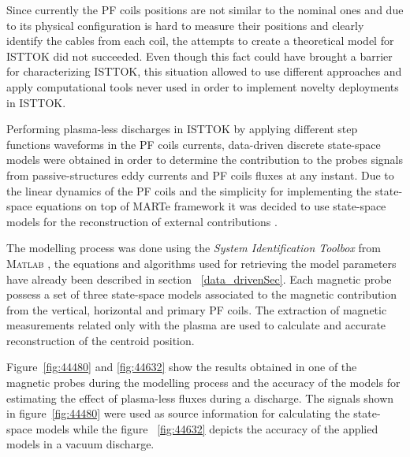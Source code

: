 Since currently the PF coils positions are not similar to the nominal ones and due to its physical configuration is hard to measure their positions and clearly identify the cables from each coil, the attempts to create a theoretical model for ISTTOK did not succeeded. Even though this fact could have brought a barrier for characterizing ISTTOK, this situation allowed to use different approaches and apply computational tools never used  in order to implement novelty deployments in ISTTOK.   \smallskip

Performing plasma-less discharges in ISTTOK by applying different step functions waveforms in the PF coils currents,  data-driven discrete state-space models were obtained in order to determine the contribution to the probes signals from passive-structures eddy currents and PF coils fluxes at any instant. Due to the linear dynamics of the PF coils and the simplicity for implementing the state-space equations on top of MARTe framework it was decided to use state-space models for the reconstruction of external contributions \cite[Chapter~2]{Chen1999}.\smallskip

 The modelling process was done using the \textit{System Identification Toolbox} from \textsc{Matlab} \cite[Chapters~2,3]{Toolbox}, the equations and algorithms used for retrieving the model parameters have already been described  in section ~\ref{data_drivenSec}. Each magnetic probe possess a set of three state-space models associated to the magnetic contribution from the vertical, horizontal and primary PF coils. The extraction of magnetic measurements related only with the plasma  are used to calculate and accurate reconstruction of the centroid position. \smallskip


Figure~\ref{fig:44480} and \ref{fig:44632} show the results obtained in one of the magnetic probes during the modelling process and the accuracy of the models for estimating the effect of plasma-less fluxes during a discharge. The signals shown in figure~\ref{fig:44480} were used as source information for calculating the state-space models while the figure ~\ref{fig:44632} depicts the accuracy of the applied models in a vacuum discharge.

